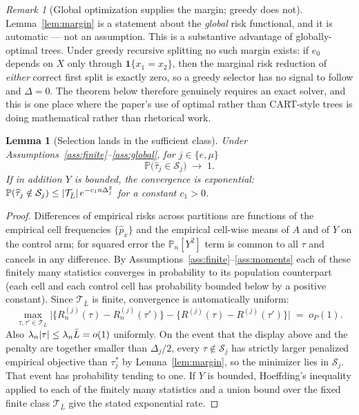 \documentclass[11pt]{article}
\theoremstyle{plain}
\newtheorem{lemma}{Lemma}
\theoremstyle{definition}
\theoremstyle{remark}
\newtheorem{remark}{Remark}
\newcommand{\PP}{\mathbb{P}}
\newcommand{\Pn}{\mathbb{P}_n}
\newcommand{\cT}{\mathcal{T}}
\newcommand{\cS}{\mathcal{S}}
\newcommand{\ez}{e_0}
\newcommand{\that}{\widehat{\tau}}
\DeclarePairedDelimiter{\card}{\lvert}{\rvert}
\begin{document}
\begin{remark}[Global optimization supplies the margin; greedy does
not]\label{rem:greedy-no-margin}
Lemma~\ref{lem:margin} is a statement about the \emph{global} risk functional,
and it is automatic --- not an assumption. This is a substantive advantage of
globally-optimal trees. Under greedy recursive splitting no such margin exists:
if $\ez$ depends on $X$ only through $\mathbf 1\{x_1=x_2\}$, then the marginal
risk reduction of \emph{either} correct first split is exactly zero, so a greedy
selector has no signal to follow and $\Delta=0$. The theorem below therefore
genuinely requires an exact solver, and this is one place where the paper's use
of optimal rather than CART-style trees is doing mathematical rather than
rhetorical work.
\end{remark}

\begin{lemma}[Selection lands in the sufficient class]\label{lem:selection}
Under Assumptions~\ref{ass:finite}--\ref{ass:global}, for $j\in\{e,\mu\}$
\[
  \PP\bigl(\that_j\in\cS_j\bigr)\;\longrightarrow\;1 .
\]
If in addition $Y$ is bounded, the convergence is exponential:
$\PP(\that_j\notin\cS_j)\le \card{\cT_{\bar L}}\,e^{-c_1 n\Delta_j^2}$ for a
constant $c_1>0$.
\end{lemma}

\begin{proof}
Differences of empirical risks across partitions are functions of the empirical
cell frequencies $\{\widehat p_x\}$ and the empirical cell-wise means of $A$ and
of $Y$ on the control arm; for squared error the $\Pn[Y^2]$ term is common to all
$\tau$ and cancels in any difference. By
Assumptions~\ref{ass:finite}--\ref{ass:moments} each of these finitely many
statistics converges in probability to its population counterpart (each cell and
each control cell has probability bounded below by a positive constant). Since
$\cT_{\bar L}$ is finite, convergence is automatically uniform:
\[
  \max_{\tau,\tau'\in\cT_{\bar L}}
  \bigl| \{R^{(j)}_n(\tau)-R^{(j)}_n(\tau')\} - \{R^{(j)}(\tau)-R^{(j)}(\tau')\}\bigr|
  \;=\; o_P(1).
\]
Also $\lambda_n\card{\tau}\le\lambda_n\bar L=o(1)$ uniformly. On the event that
the display above and the penalty are together smaller than $\Delta_j/2$, every
$\tau\notin\cS_j$ has strictly larger penalized empirical objective than
$\tau^*_j$ by Lemma~\ref{lem:margin}, so the minimizer lies in $\cS_j$. That
event has probability tending to one. If $Y$ is bounded, Hoeffding's inequality
applied to each of the finitely many statistics and a union bound over the fixed
finite class $\cT_{\bar L}$ give the stated exponential rate.
\end{proof}
\end{document}
